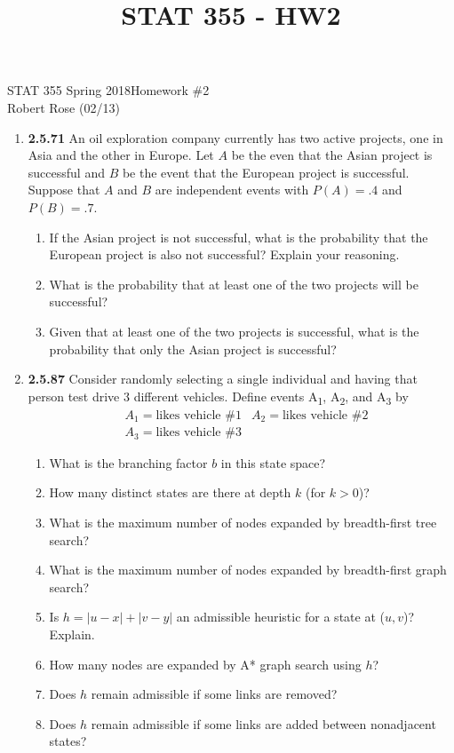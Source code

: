 \documentclass[12pt]{article}
\title{STAT 355 - HW2}
\begin{document}
STAT 355 Spring 2018\hfill Homework \#2\\
Robert Rose (02/13)

\hrulefill

\begin{enumerate}
\item \textbf{2.5.71} An oil exploration company currently has two active projects, one in Asia and the other in Europe. Let $A$ be the even that the Asian project is successful and $B$ be the event that the European project is successful. Suppose that $A$ and $B$ are independent events with $P(A) = .4$ and $P(B) = .7$.
  \begin{enumerate}
  \item If the Asian project is not successful, what is the probability that the European project is also not successful? Explain your reasoning.
  \item What is the probability that at least one of the two projects will be successful?
  \item Given that at least one of the two projects is successful, what is the probability that only the Asian project is successful?
  \end{enumerate}
\newpage

\item \textbf{2.5.87} Consider randomly selecting a single individual and having that person test drive 3 different vehicles. Define events A\textsubscript{1}, A\textsubscript{2}, and A\textsubscript{3} by
\begin{align*}
&A_1 = \text{likes vehicle \#1} & A_2 = \text{likes vehicle \#2}\\
&A_3 = \text{likes vehicle \#3} &
\end{align*}
  \begin{enumerate}
  \item What is the branching factor $b$ in this state space?
  \item How many distinct states are there at depth $k$ (for $k > 0$)?
  \item What is the maximum number of nodes expanded by breadth-first tree search?
  \item What is the maximum number of nodes expanded by breadth-first graph search?
  \item Is $h = \left|u - x\right| + \left|v - y\right|$ an admissible heuristic for a state at ($u, v$)? Explain.
  \item How many nodes are expanded by A* graph search using $h$?
  \item Does $h$ remain admissible if some links are removed?
  \item Does $h$ remain admissible if some links are added between nonadjacent states?
  \end{enumerate}


\end{enumerate}
\end{document}
